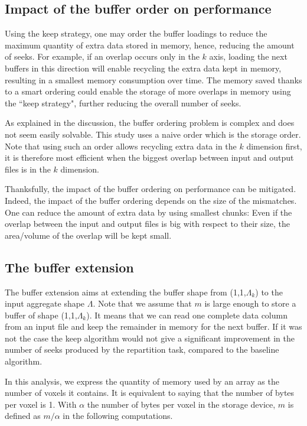 \documentclass[conference]{IEEEtran}
\begin{document}
\subsection{Impact of the buffer order on performance}
Using the keep strategy, one may order the buffer loadings to reduce the maximum
quantity of extra data stored in memory, hence, reducing the amount of seeks.
For example, if an overlap occurs only in the $k$ axis, loading the next buffers
in this direction will enable recycling the extra data kept in memory, resulting
in a smallest memory consumption over time. The memory saved thanks to a smart
ordering could enable the storage of more overlaps in memory using the
``keep strategy", further reducing the overall number of seeks.

As explained in the discussion, the buffer ordering problem is complex and does
not seem easily solvable.
This study uses a naive order which is the storage order. Note that using such
an order allows recycling extra data in the $k$ dimension first, it is therefore
most efficient when the biggest overlap between input and output files is in the
$k$ dimension.

Thanksfully, the impact of the buffer ordering on performance can be
mitigated. Indeed, the impact of the buffer ordering depends on the size of the
mismatches. One can reduce the amount of extra data by using smallest chunks: Even
if the overlap between the input and output files is big with respect to their
size, the area/volume of the overlap will be kept small.

\subsection{The buffer extension}

The buffer extension aims at extending the buffer shape from
(1,1,$\Lambda_k$) to the input aggregate shape $\Lambda$. Note that we assume
that $m$ is large enough to store a buffer of shape (1,1,$\Lambda_k$). It means
that we can read one complete data column from an input file and keep the
remainder in memory for the next buffer. If it was not the case the keep
algorithm would not give a significant improvement in the number of seeks
produced by the repartition task, compared to the baseline algorithm.

In this analysis, we express the quantity of memory used by an array as the
number of voxels it contains. It is equivalent to saying that the number of
bytes per voxel is 1. With $\alpha$ the number of bytes per voxel in the storage
device, $m$ is defined as $m/\alpha$ in the following computations.
\end{document}
